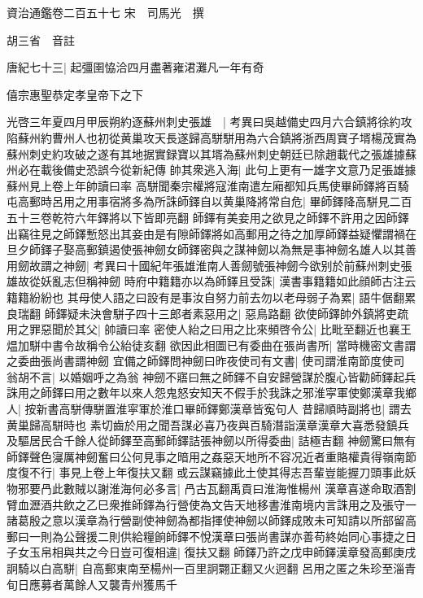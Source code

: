 資治通鑑卷二百五十七
宋　司馬光　撰

胡三省　音註

唐紀七十三|{
	起彊圉恊洽四月盡著雍涒灘凡一年有奇}


僖宗惠聖恭定孝皇帝下之下

光啓三年夏四月甲辰朔約逐蘇州刺史張雄　|{
	考異曰吳越備史四月六合鎮將徐約攻陷蘇州約曹州人也初從黄巢攻天長遂歸高駢駢用為六合鎮將浙西周寶子壻楊茂實為蘇州刺史約攻破之遂有其地据實録寶以其壻為蘇州刺史朝廷已除趙載代之張雄據蘇州必在載後備史恐誤今從新紀傳}
帥其衆逃入海|{
	此句上更有一雄字文意乃足張雄據蘇州見上卷上年帥讀曰率}
高駢聞秦宗權將寇淮南遣左廂都知兵馬使畢師鐸將百騎屯高郵時呂用之用事宿將多為所誅師鐸自以黄巢降將常自危|{
	畢師鐸降高駢見二百五十三卷乾符六年鐸將以下皆即亮翻}
師鐸有美妾用之欲見之師鐸不許用之因師鐸出竊往見之師鐸慙怒出其妾由是有隙師鐸將如高郵用之待之加厚師鐸益疑懼謂禍在旦夕師鐸子娶高郵鎮遏使張神劒女師鐸密與之謀神劒以為無是事神劒名雄人以其善用劒故謂之神劒|{
	考異曰十國紀年張雄淮南人善劒號張神劒今欲别於前蘇州刺史張雄故從妖亂志但稱神劒}
時府中籍籍亦以為師鐸且受誅|{
	漢書事籍籍如此顔師古注云籍籍紛紛也}
其母使人語之曰設有是事汝自努力前去勿以老母弱子為累|{
	語牛倨翻累良瑞翻}
師鐸疑未決會駢子四十三郎者素惡用之|{
	惡鳥路翻}
欲使師鐸帥外鎮將吏疏用之罪惡聞於其父|{
	帥讀曰率}
密使人紿之曰用之比來頻啓令公|{
	比毗至翻近也襄王煴加駢中書令故稱令公紿徒亥翻}
欲因此相圖已有委曲在張尚書所|{
	當時機密文書謂之委曲張尚書謂神劒}
宜備之師鐸問神劒曰昨夜使司有文書|{
	使司謂淮南節度使司}
翁胡不言|{
	以婚姻呼之為翁}
神劒不寤曰無之師鐸不自安歸營謀於腹心皆勸師鐸起兵誅用之師鐸曰用之數年以來人怨鬼怒安知天不假手於我誅之邪淮寜軍使鄭漢章我鄉人|{
	按新書高駢傳駢置淮寜軍於淮口畢師鐸鄭漢章皆寃句人}
昔歸順時副將也|{
	謂去黄巢歸高駢時也}
素切齒於用之聞吾謀必喜乃夜與百騎潛詣漢章漢章大喜悉發鎮兵及驅居民合千餘人從師鐸至高郵師鐸詰張神劒以所得委曲|{
	詰極吉翻}
神劒驚曰無有師鐸聲色寖厲神劒奮曰公何見事之暗用之姦惡天地所不容况近者重賂權貴得嶺南節度復不行|{
	事見上卷上年復扶又翻}
或云謀竊據此土使其得志吾輩豈能握刀頭事此妖物邪要冎此數賊以謝淮海何必多言|{
	冎古瓦翻禹貢曰淮海惟楊州}
漢章喜遂命取酒割臂血瀝酒共飲之乙巳衆推師鐸為行營使為文告天地移書淮南境内言誅用之及張守一諸葛殷之意以漢章為行營副使神劒為都指揮使神劒以師鐸成敗未可知請以所部留高郵曰一則為公聲援二則供給糧餉師鐸不悅漢章曰張尚書謀亦善苟終始同心事捷之日子女玉帛相與共之今日豈可復相違|{
	復扶又翻}
師鐸乃許之戊申師鐸漢章發高郵庚戌詗騎以白高駢|{
	自高郵東南至楊州一百里詗翾正翻又火迥翻}
呂用之匿之朱珍至淄青旬日應募者萬餘人又襲青州獲馬千

